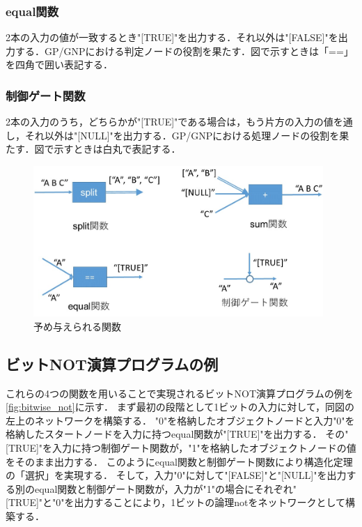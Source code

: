 \documentclass[exploratorypaper]{jsaiart} %
\begin{document}
\subsubsection{equal関数}
2本の入力の値が一致するとき"[TRUE]"を出力する．それ以外は"[FALSE]"を出力する．GP/GNPにおける判定ノードの役割を果たす．図で示すときは「==」を四角で囲い表記する．

\subsubsection{制御ゲート関数}
2本の入力のうち，どちらかが"[TRUE]"である場合は，もう片方の入力の値を通し，それ以外は"[NULL]"を出力する．GP/GNPにおける処理ノードの役割を果たす．図で示すときは白丸で表記する．

\begin{figure}[t]
    \begin{center}
        \includegraphics[width=110mm]{func.jpg}
    \end{center}
    \capwidth=90mm %
    \caption{予め与えられる関数}
    \label{fig:func}
\end{figure}

\subsection{ビットNOT演算プログラムの例}
これらの4つの関数を用いることで実現されるビットNOT演算プログラムの例を\ref{fig:bitwise_not}に示す．
まず最初の段階として1ビットの入力に対して，同図の左上のネットワークを構築する．
"0"を格納したオブジェクトノードと入力"0"を格納したスタートノードを入力に持つequal関数が"[TRUE]"を出力する．
その"[TRUE]"を入力に持つ制御ゲート関数が，"1"を格納したオブジェクトノードの値をそのまま出力する．
このようにequal関数と制御ゲート関数により構造化定理の「選択」を実現する．
そして，入力"0"に対して"[FALSE]"と"[NULL]"を出力する別のequal関数と制御ゲート関数が，入力が"1"の場合にそれぞれ"[TRUE]"と"0"を出力することにより，1ビットの論理notをネットワークとして構築する．
\end{document}
